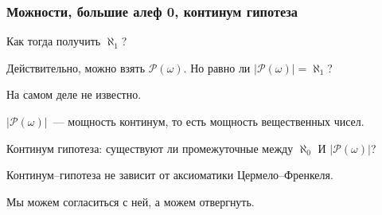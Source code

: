 \subsubsection{Можности, большие алеф 0, континум гипотеза}
Как тогда получить $\aleph_1$?

Действительно, можно взять $\mathcal{P} (\omega)$. Но равно ли $\left| \mathcal P (\omega) \right| = \aleph_1$?

На самом деле не известно.

\begin{definition}
    $\left| \mathcal{P}(\omega) \right|$~--- мощность континум, то есть мощность вещественных чисел.
\end{definition}

\begin{statement}
    Континум гипотеза: существуют ли промежуточные между $\aleph_0$ И $\left| \mathcal{P}(\omega) \right|$?
\end{statement}

\begin{theorem}
    [Коэн, 1962--1963]
    Континум--гипотеза не зависит от аксиоматики Цер\-ме\-ло--Френ\-ке\-ля.

    Мы можем согласиться с ней, а можем отвергнуть.
\end{theorem}

